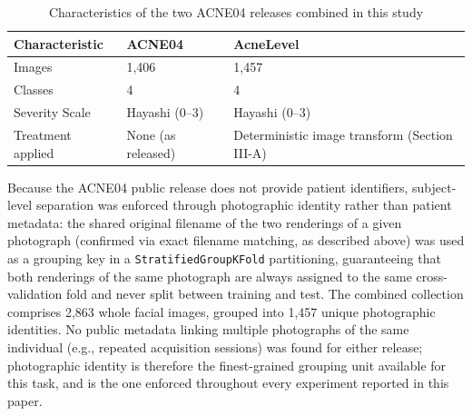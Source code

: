 \documentclass[conference]{IEEEtran}
\begin{document}
\begin{table}[H]
\centering
\caption{Characteristics of the two ACNE04 releases combined in this study}
\label{tab1}
\footnotesize
\begin{tabular}{|p{2.5cm}|p{2.1cm}|p{2.7cm}|}
\hline
\textbf{Characteristic} & \textbf{ACNE04} & \textbf{AcneLevel} \\
\hline
Images                  & 1,406           & 1,457              \\
\hline
Classes                 & 4               & 4                  \\
\hline
Severity Scale          & Hayashi (0–3)   & Hayashi (0–3)      \\
\hline
Treatment applied       & None (as released) & Deterministic image transform (Section III-A) \\
\hline
\end{tabular}
\end{table}

Because the ACNE04 public release does not provide patient identifiers, subject-level separation was enforced through photographic identity rather than patient metadata: the shared original filename of the two renderings of a given photograph (confirmed via exact filename matching, as described above) was used as a grouping key in a \texttt{StratifiedGroupKFold} partitioning, guaranteeing that both renderings of the same photograph are always assigned to the same cross-validation fold and never split between training and test. The combined collection comprises 2,863 whole facial images, grouped into 1,457 unique photographic identities. No public metadata linking multiple photographs of the same individual (e.g., repeated acquisition sessions) was found for either release; photographic identity is therefore the finest-grained grouping unit available for this task, and is the one enforced throughout every experiment reported in this paper.
\end{document}
